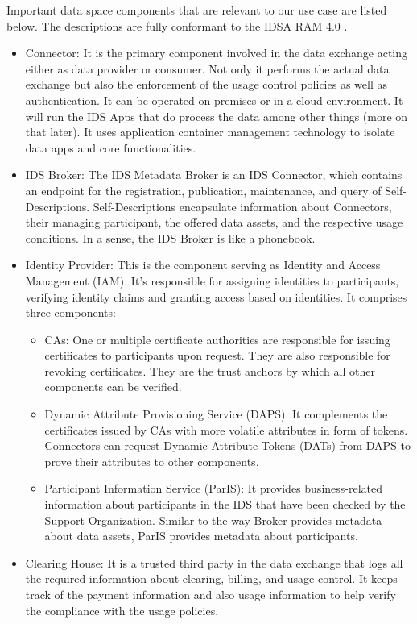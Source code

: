 \documentclass{article}
\begin{document}
Important data space components that are relevant to our use case are listed below. The descriptions are fully conformant to the IDSA RAM 4.0 \cite{otto_ids_2019}.
\begin{itemize}
    \item Connector: It is the primary component involved in the data exchange acting either as data provider or consumer. Not only it performs the actual data exchange but also the enforcement of the usage control policies as well as authentication. It can be operated on-premises or in a cloud environment. It will run the IDS Apps that do process the data among other things (more on that later). It uses application container management technology to isolate data apps and core functionalities.
    \item IDS Broker: The IDS Metadata Broker is an IDS Connector, which contains an endpoint for the registration, publication, maintenance, and query of Self-Descriptions. Self-Descriptions encapsulate information about Connectors, their managing participant, the offered data assets, and the respective usage conditions. In a sense, the IDS Broker is like a phonebook.
    \item Identity Provider: This is the component serving as Identity and Access Management (IAM). It's responsible for assigning identities to participants, verifying identity claims and granting access based on identities. It comprises three components: 
        \begin{itemize}
            \item CAs: One or multiple certificate authorities are responsible for issuing certificates to participants upon request. They are also responsible for revoking certificates. They are the trust anchors by which all other components can be verified.
            \item Dynamic Attribute Provisioning Service (DAPS): It complements the certificates issued by CAs with more volatile attributes in form of tokens. Connectors can request Dynamic Attribute Tokens (DATs) from DAPS to prove their attributes to other components.
            \item Participant Information Service (ParIS):  It provides business-related information about participants in the IDS that have been checked by the Support Organization. Similar to the way Broker provides metadata about data assets, ParIS provides metadata about participants.
        \end{itemize}
    \item Clearing House: It is a trusted third party in the data exchange that logs all the required information about clearing, billing, and usage control. It keeps track of the payment information and also usage information to help verify the compliance with the usage policies.

\end{itemize}
\end{document}
